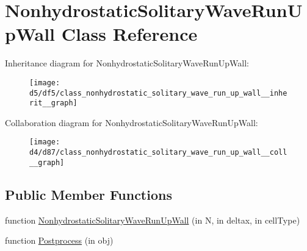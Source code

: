 \hypertarget{class_nonhydrostatic_solitary_wave_run_up_wall}{}\section{Nonhydrostatic\+Solitary\+Wave\+Run\+Up\+Wall Class Reference}
\label{class_nonhydrostatic_solitary_wave_run_up_wall}


Inheritance diagram for Nonhydrostatic\+Solitary\+Wave\+Run\+Up\+Wall\+:
\nopagebreak
\begin{figure}[H]
\begin{center}
\leavevmode
\texttt{[image: d5/df5/class\_nonhydrostatic\_solitary\_wave\_run\_up\_wall\_\_inherit\_\_graph]}
\end{center}
\end{figure}


Collaboration diagram for Nonhydrostatic\+Solitary\+Wave\+Run\+Up\+Wall\+:
\nopagebreak
\begin{figure}[H]
\begin{center}
\leavevmode
\texttt{[image: d4/d87/class\_nonhydrostatic\_solitary\_wave\_run\_up\_wall\_\_coll\_\_graph]}
\end{center}
\end{figure}
\subsection*{Public Member Functions}
\begin{DoxyCompactItemize}
\item 
function \hyperlink{class_nonhydrostatic_solitary_wave_run_up_wall_ada78062e14760d1fab87b0deef8f9028}{Nonhydrostatic\+Solitary\+Wave\+Run\+Up\+Wall} (in N, in deltax, in cell\+Type)
\item 
function \hyperlink{class_nonhydrostatic_solitary_wave_run_up_wall_aa613dec7027a7e292716aa1c346bf1c6}{Postprocess} (in obj)
\end{DoxyCompactItemize}
